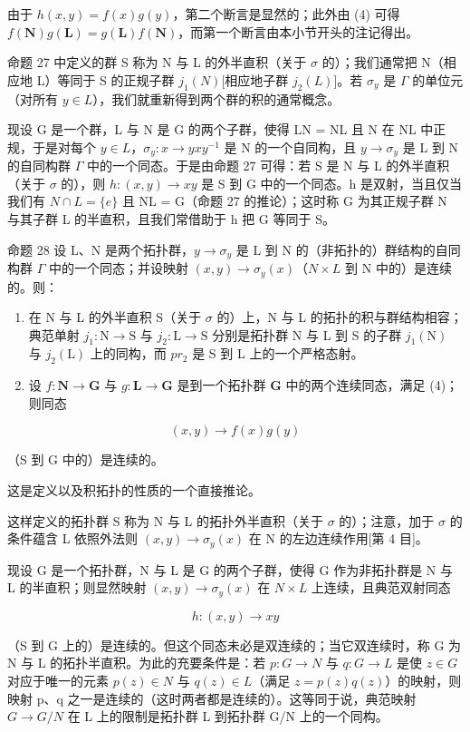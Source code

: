 由于 \(h(x, y) = f(x)g(y)\)，第二个断言是显然的；此外由 (4) 可得 \(f(\mathbf{N})g(\mathbf{L}) = g(\mathbf{L})f(\mathbf{N})\)，而第一个断言由本小节开头的注记得出。

命题 27 中定义的群 S 称为 N 与 L 的外半直积（关于 \(\sigma\) 的）；我们通常把 N（相应地 L）等同于 S 的正规子群 \(j_{1}(N)\){[}相应地子群 \(j_{2}(L)\){]}。若 \(\sigma_{y}\) 是 \(\Gamma\) 的单位元（对所有 \(y \in L\)），我们就重新得到两个群的积的通常概念。

现设 G 是一个群，L 与 N 是 G 的两个子群，使得 LN = NL 且 N 在 NL 中正规，于是对每个 \(y \in L\)，\(\sigma_{y} : x \to yxy^{-1}\) 是 N 的一个自同构，且 \(y \to \sigma_{y}\) 是 L 到 N 的自同构群 \(\Gamma\) 中的一个同态。于是由命题 27 可得：若 S 是 N 与 L 的外半直积（关于 \(\sigma\) 的），则 \(h : (x, y) \to xy\) 是 S 到 G 中的一个同态。h 是双射，当且仅当我们有 \(N \cap L = \{e\}\) 且 NL = G（命题 27 的推论）；这时称 G 为其正规子群 N 与其子群 L 的半直积，且我们常借助于 h 把 G 等同于 S。

命题 28 设 L、N 是两个拓扑群，\(y \to \sigma_y\) 是 L 到 N 的（非拓扑的）群结构的自同构群 \(\Gamma\) 中的一个同态；并设映射 \((x, y) \to \sigma_y(x)\)（\(N \times L\) 到 N 中的）是连续的。则：

\begin{enumerate}
\def\labelenumi{\arabic{enumi})}
\item
  在 N 与 L 的外半直积 S（关于 \(\sigma\) 的）上，N 与 L 的拓扑的积与群结构相容；典范单射 \(j_{1}: \mathrm{N} \to \mathrm{S}\) 与 \(j_{2}: \mathrm{L} \to \mathrm{S}\) 分别是拓扑群 N 与 L 到 S 的子群 \(j_{1}(\mathrm{N})\) 与 \(j_{2}(\mathrm{L})\) 上的同构，而 \(pr_{2}\) 是 S 到 L 上的一个严格态射。
\item
  设 \(f: \mathbf{N} \to \mathbf{G}\) 与 \(g: \mathbf{L} \to \mathbf{G}\) 是到一个拓扑群 \(\mathbf{G}\) 中的两个连续同态，满足 (4)；则同态
\end{enumerate}

\[
(x, y) \rightarrow f (x) g (y)
\]

（S 到 G 中的）是连续的。

这是定义以及积拓扑的性质的一个直接推论。

这样定义的拓扑群 S 称为 N 与 L 的拓扑外半直积（关于 \(\sigma\) 的）；注意，加于 \(\sigma\) 的条件蕴含 L 依照外法则 \((x, y) \to \sigma_{y}(x)\) 在 N 的左边连续作用{[}第 4 目{]}。

现设 G 是一个拓扑群，N 与 L 是 G 的两个子群，使得 G 作为非拓扑群是 N 与 L 的半直积；则显然映射 \((x, y) \to \sigma_{y}(x)\) 在 \(N \times L\) 上连续，且典范双射同态

\[
h: (x, y) \rightarrow x y
\]

（S 到 G 上的）是连续的。但这个同态未必是双连续的；当它双连续时，称 G 为 N 与 L 的拓扑半直积。为此的充要条件是：若 \(p: G \to N\) 与 \(q: G \to L\) 是使 \(z \in G\) 对应于唯一的元素 \(p(z) \in N\) 与 \(q(z) \in L\)（满足 \(z = p(z)q(z)\)）的映射，则映射 p、q 之一是连续的（这时两者都是连续的）。这等同于说，典范映射 \(G \to G/N\) 在 L 上的限制是拓扑群 L 到拓扑群 G/N 上的一个同构。

